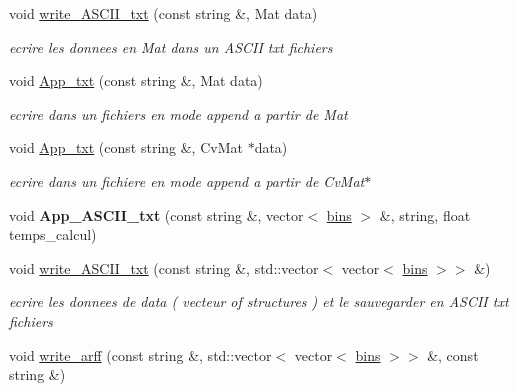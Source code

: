 \begin{DoxyCompactItemize}
\item 
\hypertarget{class_fichiers_a70a76b5bb9684c5e45a74f4c91c52867}{
void \hyperlink{class_fichiers_a70a76b5bb9684c5e45a74f4c91c52867}{write\_\-ASCII\_\-txt} (const string \&, Mat data)}
\label{class_fichiers_a70a76b5bb9684c5e45a74f4c91c52867}

\begin{DoxyCompactList}\small\item\em ecrire les donnees en Mat dans un ASCII txt fichiers \end{DoxyCompactList}\item 
\hypertarget{class_fichiers_a94a84fc5e79605b1d0051921df99eca9}{
void \hyperlink{class_fichiers_a94a84fc5e79605b1d0051921df99eca9}{App\_\-txt} (const string \&, Mat data)}
\label{class_fichiers_a94a84fc5e79605b1d0051921df99eca9}

\begin{DoxyCompactList}\small\item\em ecrire dans un fichiers en mode append a partir de Mat \end{DoxyCompactList}\item 
\hypertarget{class_fichiers_aa2e5ca02d1eca9a5291984f647e2979d}{
void \hyperlink{class_fichiers_aa2e5ca02d1eca9a5291984f647e2979d}{App\_\-txt} (const string \&, CvMat $\ast$data)}
\label{class_fichiers_aa2e5ca02d1eca9a5291984f647e2979d}

\begin{DoxyCompactList}\small\item\em ecrire dans un fichiere en mode append a partir de CvMat$\ast$ \end{DoxyCompactList}\item 
\hypertarget{class_fichiers_ab90e0e6a8acff1c6eb7c5d047fe6a70e}{
void {\bfseries App\_\-ASCII\_\-txt} (const string \&, vector$<$ \hyperlink{classbins}{bins} $>$ \&, string, float temps\_\-calcul)}
\label{class_fichiers_ab90e0e6a8acff1c6eb7c5d047fe6a70e}

\item 
\hypertarget{class_fichiers_acf8da208464aad63966675b548a2bda6}{
void \hyperlink{class_fichiers_acf8da208464aad63966675b548a2bda6}{write\_\-ASCII\_\-txt} (const string \&, std::vector$<$ vector$<$ \hyperlink{classbins}{bins} $>$$>$ \&)}
\label{class_fichiers_acf8da208464aad63966675b548a2bda6}

\begin{DoxyCompactList}\small\item\em ecrire les donnees de data ( vecteur of structures ) et le sauvegarder en ASCII txt fichiers \end{DoxyCompactList}\item 
\hypertarget{class_fichiers_ad2e3be80160b35633c2bfab6b1022505}{
void \hyperlink{class_fichiers_ad2e3be80160b35633c2bfab6b1022505}{write\_\-arff} (const string \&, std::vector$<$ vector$<$ \hyperlink{classbins}{bins} $>$$>$ \&, const string \&)}
\label{class_fichiers_ad2e3be80160b35633c2bfab6b1022505}


\end{DoxyCompactItemize}
